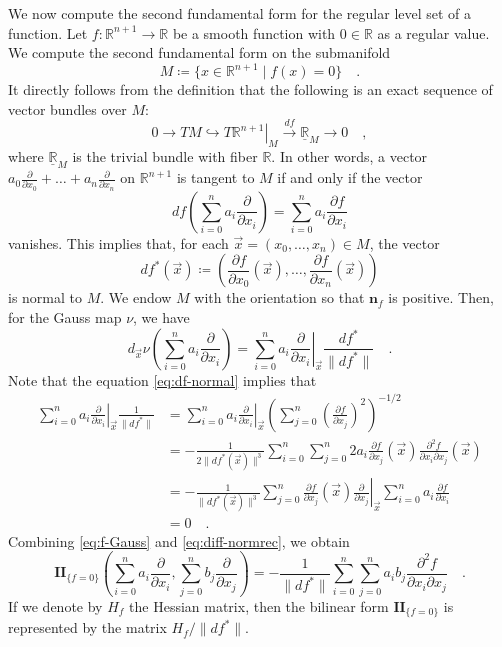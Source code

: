 \documentclass[pdftex,a4paper,12pt]{scrartcl}
\theoremstyle{plain}
\theoremstyle{definition}
\theoremstyle{remark}
\numberwithin{equation}{section}
\begin{document}
We now compute the second fundamental form for the regular level set of a function.
Let $f:\mathbb R^{n+1}\to\mathbb R$ be a smooth function with $0\in\mathbb R$ as a regular value.
We compute the second fundamental form on the submanifold
\[
M\coloneqq\{x\in\mathbb R^{n+1}\mid f(x)=0\}
\quad.
\]
It directly follows from the definition that the following is an exact sequence of vector bundles over $M$:
\[
0\to TM\hookrightarrow \left.T\mathbb R^{n+1}\right|_M \xrightarrow{df} \underline{\mathbb R}_M\to 0
\quad,
\]
where $\underline{\mathbb R}_M$ is the trivial bundle with fiber $\mathbb R$.
In other words, a vector $a_0\frac\partial{\partial x_0}+\dots+a_n\frac\partial{\partial x_n}$ on $\mathbb R^{n+1}$ is tangent to $M$ if and only if the vector
\begin{equation}
\label{eq:df-normal}
df\left(\sum_{i=0}^n a_i\frac\partial{\partial x_i}\right)
= \sum_{i=0}^n a_i\frac{\partial f}{\partial x_i}
\end{equation}
vanishes.
This implies that, for each $\vec x=(x_0,\dots,x_n)\in M$, the vector
\[
df^\ast(\vec x)
\coloneqq \left(\frac{\partial f}{\partial x_0}(\vec x),\dots,\frac{\partial f}{\partial x_n}(\vec x)\right)
\]
is normal to $M$.
We endow $M$ with the orientation so that $\mathbf n_f$ is positive.
Then, for the Gauss map $\nu$, we have
\begin{equation}
\label{eq:f-Gauss}
d_{\vec x}\nu\left(\sum_{i=0}^n a_i\frac\partial{\partial x_i}\right)
= \sum_{i=0}^n a_i \left.\frac{\partial}{\partial x_i}\right|_{\vec x} \frac{df^\ast}{\|df^\ast\|}
\quad.
\end{equation}
Note that the equation \eqref{eq:df-normal} implies that
\begin{equation}
\label{eq:diff-normrec}
\begin{split}
\sum_{i=0}^n a_i\left.\frac{\partial}{\partial x_i}\right|_{\vec x}
\frac1{\|df^\ast\|}
&= \sum_{i=0}^n a_i\left.\frac{\partial}{\partial x_i}\right|_{\vec x}\left(\sum_{j=0}^n\left(\frac{\partial f}{\partial x_j}\right)^2\right)^{-1/2} \\
& = -\frac1{2\|df^\ast(\vec x)\|^3} \sum_{i=0}^n\sum_{j=0}^n 2a_i\frac{\partial f}{\partial x_j}(\vec x)\frac{\partial^2f}{\partial x_i\partial x_j}(\vec x) \\
& = -\frac1{\|df^\ast(\vec x)\|^3}\sum_{j=0}^n \frac{\partial f}{\partial x_j}(\vec x)\left.\frac{\partial}{\partial x_j}\right|_{\vec x} \sum_{i=0}^n a_i\frac{\partial f}{\partial x_i} \\
& = 0
\quad.
\end{split}
\end{equation}
Combining \eqref{eq:f-Gauss} and \eqref{eq:diff-normrec}, we obtain
\begin{equation}
\label{eq:f-II-form}
\mathbf{II}_{\{f=0\}}\left(\sum_{i=0}^na_i\frac{\partial}{\partial x_i},\sum_{j=0}^nb_j\frac\partial{\partial x_j}\right)
= -\frac{1}{\|df^\ast\|}\sum_{i=0}^n\sum_{j=0}^n a_ib_j\frac{\partial^2f }{\partial x_i\partial x_j}
\quad.
\end{equation}
If we denote by $H_f$ the Hessian matrix, then the bilinear form $\mathbf{II}_{\{f=0\}}$ is represented by the matrix $H_f/\|df^\ast\|$.
\end{document}
